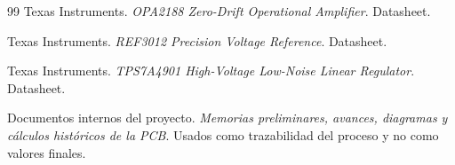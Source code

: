 \documentclass[12pt]{article}
\begin{document}
\begin{thebibliography}{99}
Texas Instruments. \emph{OPA2188 Zero-Drift Operational Amplifier}. Datasheet.

Texas Instruments. \emph{REF3012 Precision Voltage Reference}. Datasheet.

Texas Instruments. \emph{TPS7A4901 High-Voltage Low-Noise Linear Regulator}. Datasheet.

Documentos internos del proyecto. \emph{Memorias preliminares, avances, diagramas y cálculos históricos de la PCB}. Usados como trazabilidad del proceso y no como valores finales.

\end{thebibliography}
\end{document}
